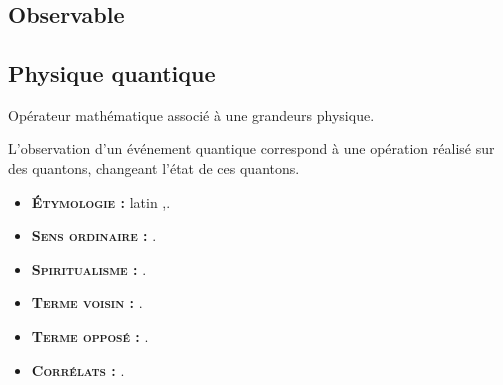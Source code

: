 \chapter{}
\section{Observable}

\section{Physique quantique}

Opérateur mathématique associé à une grandeurs physique.

L'observation d'un événement quantique correspond à une opération réalisé sur des quantons, changeant l'état de ces quantons.

 

{\footnotesize
\begin{itemize}[leftmargin=1cm, label=, itemsep=1pt]
\item {\bf \textsc{Étymologie} :} latin {\it },.
\item {\bf \textsc{Sens ordinaire} :} .
\item {\bf \textsc{Spiritualisme} :} .
\end{itemize}

\begin{itemize}[leftmargin=1cm, label=, itemsep=1pt]
\item {\bf \textsc{Terme voisin} :} .
\item {\bf \textsc{Terme opposé} :} .
\item {\bf \textsc{Corrélats} :} .
\end{itemize}
}

